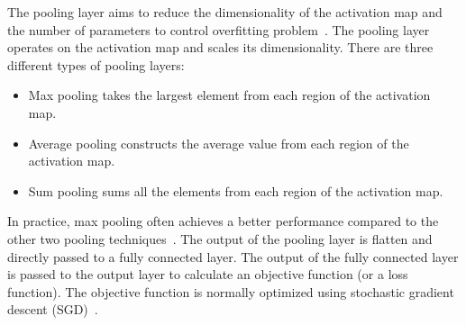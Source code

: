 The pooling layer aims to reduce the dimensionality of the activation map and the number of parameters to control overfitting problem~\cite{tolias2015particular}. The pooling layer operates on the activation map and scales its dimensionality. There are three different types of pooling layers:
\begin{itemize}
	\item Max pooling takes the largest element from each region of the activation map.
	\item Average pooling constructs the average value from each region of the activation map.
	\item Sum pooling sums all the elements from each region of the activation map. 
\end{itemize}
In practice, max pooling often achieves a better performance compared to the other two pooling techniques~\cite{zeiler2013stochastic}.
The output of the pooling layer is flatten and directly passed to a fully connected layer. The output of the fully connected layer is passed to the output layer to calculate an objective function (or a loss function). The objective function is normally optimized using stochastic gradient descent (SGD)~\cite{bottou2010large}. %



